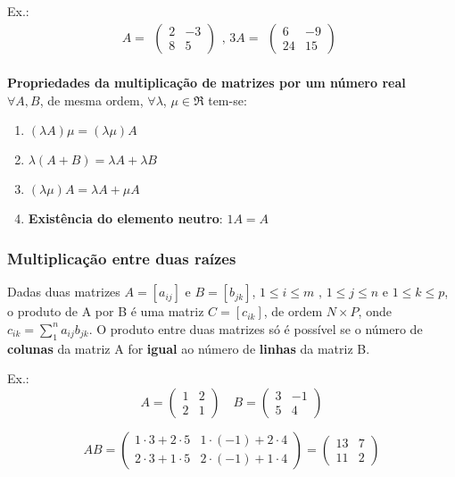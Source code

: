\documentclass[12pt]{article}
\begin{document}
\noindent
Ex.: \[ A =
\begin{array}{c}
    \begin{pmatrix}
         2  & -3 \\
         8  &  5
    \end{pmatrix}
\end{array}
    \text{, }
3A = 
\begin{array}{c}
    \begin{pmatrix}
         6  &  -9 \\
        24  & 15
    \end{pmatrix}
\end{array}
\]
\\
\noindent
\textbf{Propriedades da multiplicação de matrizes por um número real}
\\
$\forall A,B$, de mesma ordem, $\forall \lambda$, $\mu \in \Re$  tem-se:
\begin{enumerate}[label=\textbf{\alph*)}]
    \item \( (\lambda A) \mu = (\lambda \mu) A \)
    \item \( \lambda (A+B) = \lambda A + \lambda B \)
    \item \( (\lambda \mu) A = \lambda A + \mu A \)
    \item \textbf{Existência do elemento neutro}: \( 1A = A \)
\end{enumerate}

\subsubsection{Multiplicação entre duas raízes}
Dadas duas matrizes $A=[a_{ij}] \text{ e } B=[b_{jk}]$, $1 \leq i \leq m \text{ , } 1 \leq j \leq n \text{ e } 1 \leq k \leq p$,
o produto de A por B é uma matriz $C=[c_{ik}]$, de ordem $N \times P$, onde $c_{ik} = \sum_{1}^{n} a_{ij}b_{jk}$.
O produto entre duas matrizes só é possível se o número de \textbf{colunas} da matriz A for \textbf{igual} ao número de \textbf{linhas} da matriz B.

\noindent
Ex.: \[
A =
    \begin{pmatrix}
        1  &  2 \\
        2  &  1
    \end{pmatrix}
\quad
B =
    \begin{pmatrix}
        3  & -1 \\
        5  &  4
    \end{pmatrix}
\]

\[
AB =
    \begin{pmatrix}
        1 \cdot 3 + 2 \cdot 5 & 1 \cdot (-1) + 2 \cdot 4 \\
        2 \cdot 3 + 1 \cdot 5 & 2 \cdot (-1) + 1 \cdot 4
    \end{pmatrix}
=
    \begin{pmatrix}
        13  &  7 \\
        11  &  2
    \end{pmatrix}
\]
\end{document}
